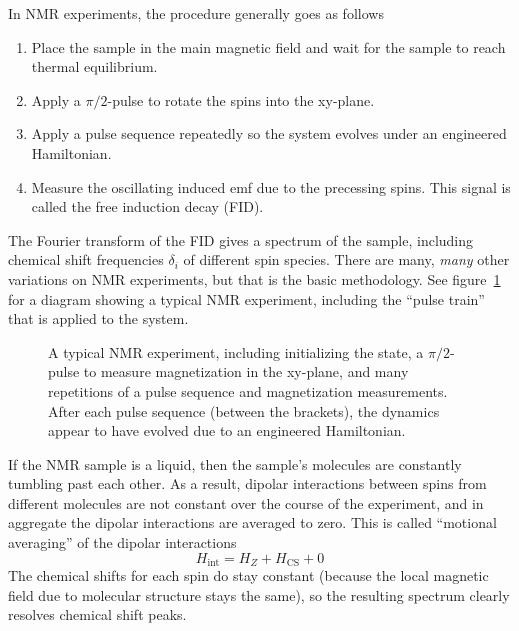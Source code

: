 In NMR experiments, the procedure generally goes as follows
\begin{enumerate}
    \item Place the sample in the main magnetic field and wait for the sample to reach thermal equilibrium.
    \item Apply a $\pi/2$-pulse to rotate the spins into the xy-plane.
    \item Apply a pulse sequence repeatedly so the system evolves under an engineered Hamiltonian.
    \item Measure the oscillating induced emf due to the precessing spins. This signal is called the free induction decay (FID).
\end{enumerate}
The Fourier transform of the FID gives a spectrum of the sample, including chemical shift frequencies $\delta_i$ of different spin species. There are many, \emph{many} other variations on NMR experiments, but that is the basic methodology. See figure~\ref{fig:NMR-Pulse-Train} for a diagram showing a typical NMR experiment, including the ``pulse train'' that is applied to the system.

\begin{figure}[H]
    \centering
    
    \caption{A typical NMR experiment, including initializing the state, a $\pi/2$-pulse to measure magnetization in the xy-plane, and many repetitions of a pulse sequence and magnetization measurements. After each pulse sequence (between the brackets), the dynamics appear to have evolved due to an engineered Hamiltonian.}
    \label{fig:NMR-Pulse-Train}
\end{figure}


If the NMR sample is a liquid, then the sample's molecules are constantly tumbling past each other. As a result, dipolar interactions between spins from different molecules are not constant over the course of the experiment, and in aggregate the dipolar interactions are averaged to zero. This is called ``motional averaging'' of the dipolar interactions
\[
H_{\text{int}} = H_Z + H_\text{CS} + 0
\]
The chemical shifts for each spin do stay constant (because the local magnetic field due to molecular structure stays the same), so the resulting spectrum clearly resolves chemical shift peaks.

